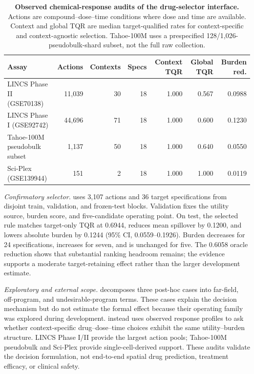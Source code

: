 \documentclass[sigconf,review,balance=false]{acmart}
\begin{document}
\begin{table}[t]
\centering
\small
\caption{\textbf{Observed chemical-response audits of the drug-selector
interface.} Actions are compound--dose--time conditions where dose and time
are available. Context and global TQR are median target-qualified rates for
context-specific and context-agnostic selection. Tahoe-100M uses a
prespecified 128/1,026-pseudobulk-shard subset, not the full raw collection.}
\label{tab:app_chemical_selector}
\setlength{\tabcolsep}{4.5pt}
\begin{tabular}{@{}lrrrrrr@{}}
\toprule
Assay & Actions & Contexts & Specs & Context TQR & Global TQR & Burden red. \\
\midrule
LINCS Phase II (GSE70138) & 11,039 & 30 & 18 & 1.000 & 0.567 & 0.0988 \\
LINCS Phase I (GSE92742) & 44,696 & 71 & 18 & 1.000 & 0.600 & 0.1230 \\
Tahoe-100M pseudobulk subset & 1,137 & 50 & 18 & 1.000 & 0.640 & 0.0550 \\
Sci-Plex (GSE139944) & 151 & 2 & 18 & 1.000 & 1.000 & 0.0119 \\
\bottomrule
\end{tabular}
\vspace{6pt}

\begin{minipage}[t]{0.47\textwidth}
\raggedright\footnotesize
\textit{Confirmatory selector.}
 uses 3,107 actions and 36 target specifications
from disjoint train, validation, and frozen-test blocks. Validation fixes the
utility source, burden score, and five-candidate operating point. On test, the
selected rule matches target-only TQR at 0.6944, reduces mean spillover by
0.1200, and lowers absolute burden by 0.1244 (95\% CI,
0.0559--0.1926). Burden decreases for 24 specifications, increases for seven,
and is unchanged for five. The 0.6058 oracle reduction shows that substantial
ranking headroom remains; the evidence supports a moderate target-retaining
effect rather than the larger development estimate.
\end{minipage}
\hfill
\begin{minipage}[t]{0.47\textwidth}
\raggedright\footnotesize
\textit{Exploratory and external scope.}
 decomposes three post-hoc cases
into far-field, off-program, and undesirable-program terms. These cases explain
the decision mechanism but do not estimate the formal effect because their
operating family was explored during development.
 instead uses observed response profiles to ask
whether context-specific drug--dose--time choices exhibit the same
utility--burden structure. LINCS Phase I/II provide the largest action pools;
Tahoe-100M pseudobulk and Sci-Plex provide single-cell-derived support. These
audits validate the decision formulation, not end-to-end spatial drug
prediction, treatment efficacy, or clinical safety.
\end{minipage}
\end{table}
\end{document}
